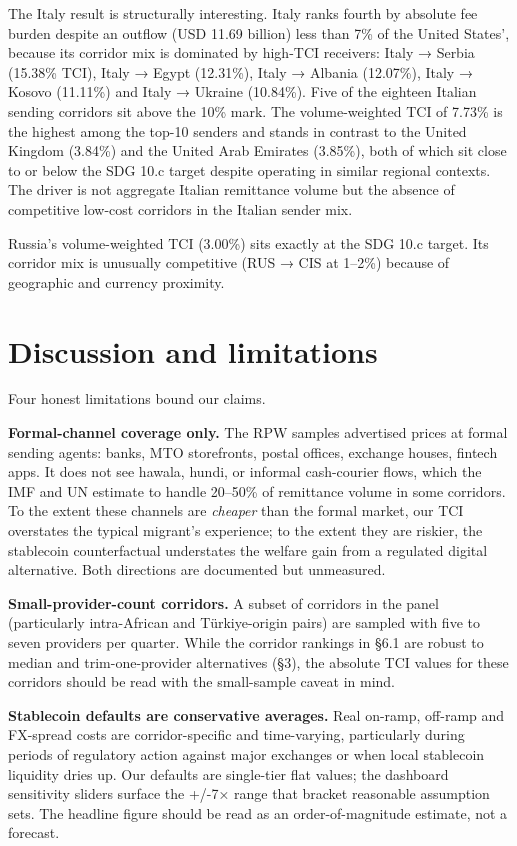 \documentclass[
  11pt,
]{article}
\begin{document}
The Italy result is structurally interesting. Italy ranks fourth by
absolute fee burden despite an outflow (USD 11.69 billion) less than 7\%
of the United States', because its corridor mix is dominated by high-TCI
receivers: Italy → Serbia (15.38\% TCI), Italy → Egypt (12.31\%), Italy
→ Albania (12.07\%), Italy → Kosovo (11.11\%) and Italy → Ukraine
(10.84\%). Five of the eighteen Italian sending corridors sit above the
10\% mark. The volume-weighted TCI of 7.73\% is the highest among the
top-10 senders and stands in contrast to the United Kingdom (3.84\%) and
the United Arab Emirates (3.85\%), both of which sit close to or below
the SDG 10.c target despite operating in similar regional contexts. The
driver is not aggregate Italian remittance volume but the absence of
competitive low-cost corridors in the Italian sender mix.

Russia's volume-weighted TCI (3.00\%) sits exactly at the SDG 10.c
target. Its corridor mix is unusually competitive (RUS → CIS at 1--2\%)
because of geographic and currency proximity.

\section{Discussion and limitations}\label{discussion-and-limitations}

Four honest limitations bound our claims.

\textbf{Formal-channel coverage only.} The RPW samples advertised prices
at formal sending agents: banks, MTO storefronts, postal offices,
exchange houses, fintech apps. It does not see hawala, hundi, or
informal cash-courier flows, which the IMF and UN estimate to handle
20--50\% of remittance volume in some corridors. To the extent these
channels are \emph{cheaper} than the formal market, our TCI overstates
the typical migrant's experience; to the extent they are riskier, the
stablecoin counterfactual understates the welfare gain from a regulated
digital alternative. Both directions are documented but unmeasured.

\textbf{Small-provider-count corridors.} A subset of corridors in the
panel (particularly intra-African and Türkiye-origin pairs) are sampled
with five to seven providers per quarter. While the corridor rankings in
§6.1 are robust to median and trim-one-provider alternatives (§3), the
absolute TCI values for these corridors should be read with the
small-sample caveat in mind.

\textbf{Stablecoin defaults are conservative averages.} Real on-ramp,
off-ramp and FX-spread costs are corridor-specific and time-varying,
particularly during periods of regulatory action against major exchanges
or when local stablecoin liquidity dries up. Our defaults are
single-tier flat values; the dashboard sensitivity sliders surface the
+/-7× range that bracket reasonable assumption sets. The headline figure
should be read as an order-of-magnitude estimate, not a forecast.
\end{document}
